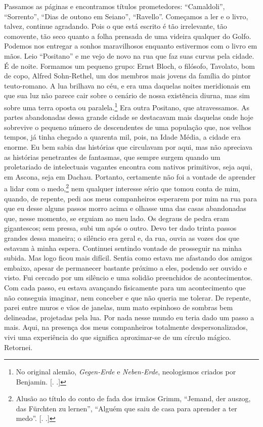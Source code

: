 Passamos as páginas e encontramos títulos prometedores: ``Camaldoli'',
``Sorrento'', ``Dias de outono em Seiano'', ``Ravello''. Começamos a ler
e o livro, talvez, continue agradando. Pois o que está escrito é tão
irrelevante, tão comovente, tão seco quanto a folha prensada de uma
videira qualquer do Golfo. Podemos nos entregar a sonhos maravilhosos
enquanto estivermos com o livro em mãos. Leio ``Positano'' e me vejo de
novo na rua que faz suas curvas pela cidade. É de noite. Formamos um
pequeno grupo: Ernst Bloch, o filósofo, Tavolato, bom de copo, Alfred
Sohn-Rethel, um dos membros mais jovens da família do pintor
teuto-romano. A lua brilhava no céu, e era uma daquelas noites
meridionais em que sua luz não parece cair sobre o cenário de nossa
existência diurna, mas sim sobre uma terra oposta ou paralela\label{supra10}.\footnote{No
  original alemão, \emph{Gegen-Erde} e \emph{Neben-Erde}, neologismos
  criados por Benjamin. [. .]} Era outra Positano, que
atravessamos. As partes abandonadas dessa grande cidade se destacavam
mais daquelas onde hoje sobrevive o pequeno número de descendentes de
uma população que, nos velhos tempos, já tinha chegado a quarenta mil,
pois, na Idade Média, a cidade era enorme. Eu bem sabia das histórias
que circulavam por aqui, mas não apreciava as histórias penetrantes de
fantasmas, que sempre surgem quando um proletariado de intelectuais
vagantes encontra com nativos primitivos, seja aqui, em Ascona, seja em
Dachau. Portanto, certamente não foi a vontade de aprender a lidar com o
medo,\footnote{Alusão ao título do conto de fada dos irmãos Grimm,
  ``Jemand, der auszog, das Fürchten zu lernen'', ``Alguém que saiu de
  casa para aprender a ter medo''. [. .]} nem qualquer
interesse sério que tomou conta de mim, quando, de repente, pedi aos
meus companheiros esperarem por mim na rua para que eu desse alguns
passos morro acima e olhasse uma das casas abandonadas que, nesse
momento, se erguiam ao meu lado. Os degraus de pedra eram gigantescos;
sem pressa, subi um após o outro. Devo ter dado trinta passos grandes
dessa maneira; o silêncio era geral e, da rua, ouvia as vozes dos que
estavam à minha espera. Continuei sentindo vontade de prosseguir na
minha subida. Mas logo ficou mais difícil. Sentia como estava me
afastando dos amigos embaixo, apesar de permanecer bastante próximo a
eles, podendo ser ouvido e visto. Fui cercado por um silêncio e uma
solidão preenchidos de acontecimentos. Com cada passo, eu estava
avançando fisicamente para um acontecimento que não conseguia imaginar,
nem conceber e que não queria me tolerar. De repente, parei entre muros
e vãos de janelas, num mato espinhoso de sombras bem delineadas,
projetadas pela lua. Por nada nesse mundo eu teria dado um passo a mais.
Aqui, na presença dos meus companheiros totalmente despersonalizados,
vivi uma experiência do que significa aproximar-se de um círculo mágico.
Retornei.

